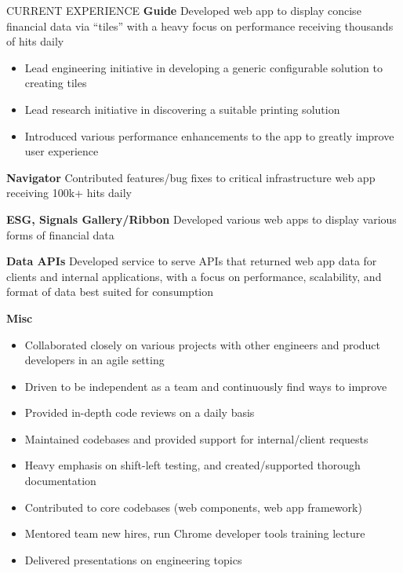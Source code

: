 \documentclass{edit} %
\begin{document}
\begin{rSection}{CURRENT EXPERIENCE}
\textbf{Guide} {Developed web app to display concise financial data via ``tiles'' with a heavy focus on performance receiving thousands of hits daily }
\begin{itemize}
    \itemsep -9pt {}
    \item Lead engineering initiative in developing a generic configurable solution to creating tiles
    \item Lead research initiative in discovering a suitable printing solution
    \item Introduced various performance enhancements to the app to greatly improve user experience
\end{itemize}
\item \textbf{Navigator} {Contributed features/bug fixes to critical infrastructure web app receiving 100k+ hits daily}
\item \textbf{ESG, Signals Gallery/Ribbon} {Developed various web apps to display various forms of financial data}
\item \textbf{Data APIs} {Developed service to serve APIs that returned web app data for clients and internal applications, with a focus on performance, scalability, and format of data best suited for consumption}
\item \textbf{Misc}
\begin{itemize}
    \itemsep -9pt {}
    \item Collaborated closely on various projects with other engineers and product developers in an agile setting
    \item Driven to be independent as a team and continuously find ways to improve
    \item Provided in-depth code reviews on a daily basis
    \item Maintained codebases and provided support for internal/client requests
    \item Heavy emphasis on shift-left testing, and created/supported thorough documentation
    \item Contributed to core codebases (web components, web app framework)
    \item Mentored team new hires, run Chrome developer tools training lecture
    \item Delivered presentations on engineering topics
\end{itemize}
\end{rSection}

\end{document}
